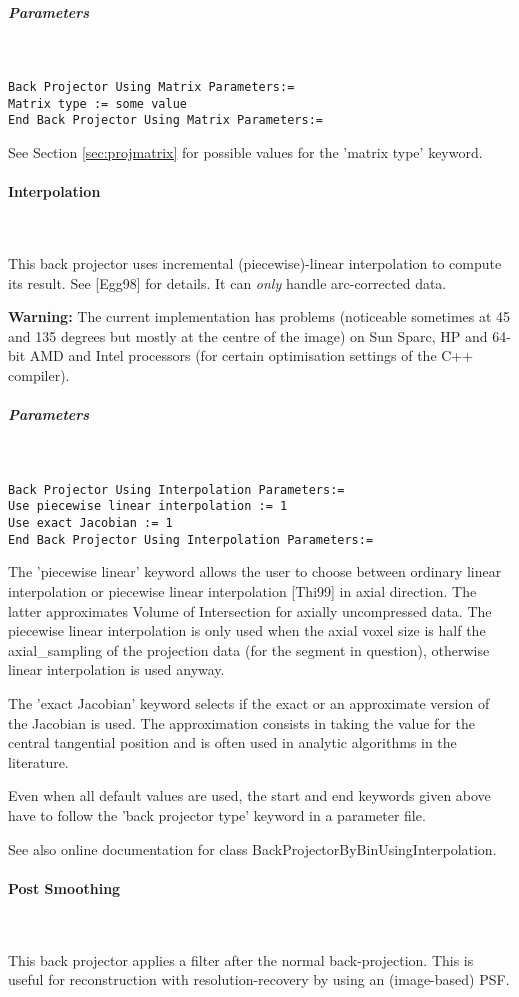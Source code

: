 \documentclass{article}
\newcommand{\subsubsubsection}[1]{\paragraph{#1}\mbox{} \\}
\newcommand{\subsubsubsubsection}[1]{\subparagraph{#1} \mbox{} \\}
\begin{document}
{{{ \subsubsubsubsection{Parameters}
}
\begin{verbatim}
Back Projector Using Matrix Parameters:=
Matrix type := some value
End Back Projector Using Matrix Parameters:=
\end{verbatim}

See Section \ref{sec:projmatrix} for possible values for the 'matrix type' keyword.

{ \subsubsubsection{Interpolation}
}
\label{sec:IncrementalInterpolationBackProjector}
This back projector uses incremental (piecewise)-linear interpolation 
to compute its result. See [Egg98] for details. It can \textit{only} handle arc-corrected data.


\textbf{Warning:} The current implementation has problems (noticeable 
sometimes at 45 and 135 degrees but mostly at the centre of the image) on Sun 
Sparc, HP and 64-bit AMD and Intel processors (for certain optimisation settings
of the C++ compiler).

{ \subsubsubsubsection{Parameters}
}
\begin{verbatim}
Back Projector Using Interpolation Parameters:=
Use piecewise linear interpolation := 1
Use exact Jacobian := 1
End Back Projector Using Interpolation Parameters:=
\end{verbatim}

The 'piecewise linear' keyword allows the user to choose between 
ordinary linear interpolation or piecewise linear interpolation 
[Thi99] in axial direction. The latter approximates Volume of 
Intersection for axially uncompressed data. The piecewise linear 
interpolation is only used when the axial voxel size is half 
the axial\_sampling of the projection data (for the segment in 
question), otherwise linear interpolation is used anyway.


The 'exact Jacobian' keyword selects if the exact or an approximate 
version of the Jacobian is used. The approximation consists in 
taking the value for the central tangential position and is often 
used in analytic algorithms in the literature.


Even when all default values are used, the start and end keywords 
given above have to follow the 'back projector type' keyword 
in a parameter file.


See also online documentation for class BackProjectorByBinUsingInterpolation.

{ \subsubsubsection{Post Smoothing}
}
This back projector applies a filter after the normal back-projection.
This is useful for reconstruction with resolution-recovery 
by using an (image-based) PSF.

}}
\end{document}
